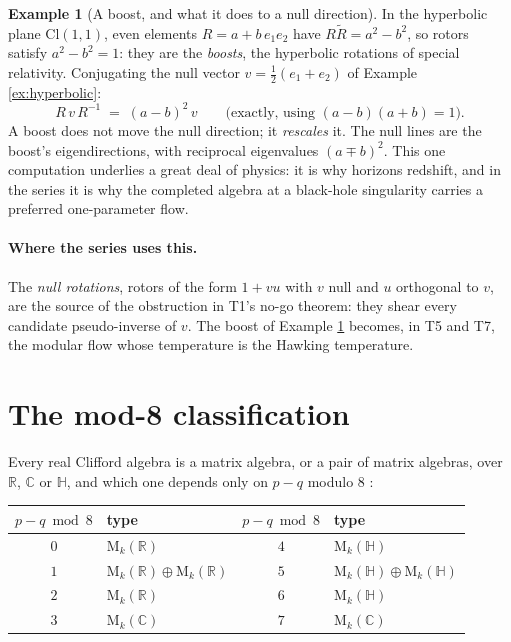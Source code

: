 \documentclass[11pt]{article}
\theoremstyle{plain}
\theoremstyle{definition}
\newtheorem{example}{Example}[section]
\newcommand{\Cl}{\mathrm{Cl}}
\newcommand{\R}{\mathbb{R}}
\newcommand{\C}{\mathbb{C}}
\newcommand{\HH}{\mathbb{H}}
\newcommand{\Mat}{\mathrm{M}}
\begin{document}
\begin{example}[A boost, and what it does to a null direction]\label{ex:boost}
In the hyperbolic plane $\Cl(1,1)$, even elements $R = a + b\, e_1 e_2$ have $R\tilde R = a^2 - b^2$, so rotors satisfy $a^{2} - b^{2} = 1$: they are the \emph{boosts}, the hyperbolic rotations of special relativity. Conjugating the null vector $v = \tfrac12(e_1 + e_2)$ of Example \ref{ex:hyperbolic}:
\[
R\,v\,R^{-1} \;=\; (a - b)^{2}\, v \qquad \text{(exactly, using } (a-b)(a+b) = 1\text{)}.
\]
A boost does not move the null direction; it \emph{rescales} it. The null lines are the boost's eigendirections, with reciprocal eigenvalues $(a \mp b)^{2}$. This one computation underlies a great deal of physics: it is why horizons redshift, and in the series it is why the completed algebra at a black-hole singularity carries a preferred one-parameter flow.
\end{example}

\paragraph{Where the series uses this.} The \emph{null rotations}, rotors of the form $1 + vu$ with $v$ null and $u$ orthogonal to $v$, are the source of the obstruction in T1's no-go theorem: they shear every candidate pseudo-inverse of $v$. The boost of Example \ref{ex:boost} becomes, in T5 and T7, the modular flow whose temperature is the Hawking temperature.

\section{The mod-8 classification}\label{sec:clock}

Every real Clifford algebra is a matrix algebra, or a pair of matrix algebras, over $\R$, $\C$ or $\HH$, and which one depends only on $p - q$ modulo 8 \cite{ABS1964, Porteous1995, Lounesto2001}:

\begin{center}
\begin{tabular}{cl@{\qquad}cl}
\toprule
$p-q \bmod 8$ & type & $p-q \bmod 8$ & type \\
\midrule
$0$ & $\Mat_k(\R)$              & $4$ & $\Mat_k(\HH)$ \\
$1$ & $\Mat_k(\R) \oplus \Mat_k(\R)$ & $5$ & $\Mat_k(\HH) \oplus \Mat_k(\HH)$ \\
$2$ & $\Mat_k(\R)$              & $6$ & $\Mat_k(\HH)$ \\
$3$ & $\Mat_k(\C)$              & $7$ & $\Mat_k(\C)$ \\
\bottomrule
\end{tabular}
\end{center}
\end{document}
